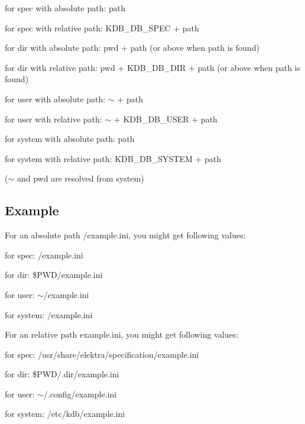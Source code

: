 \begin{DoxyItemize}
\item for spec with absolute path\+: path
\item for spec with relative path\+: {\ttfamily K\+D\+B\+\_\+\+D\+B\+\_\+\+S\+P\+EC} + path
\item for dir with absolute path\+: {\ttfamily pwd} + path (or above when path is found)
\item for dir with relative path\+: {\ttfamily pwd} + {\ttfamily K\+D\+B\+\_\+\+D\+B\+\_\+\+D\+IR} + path (or above when path is found)
\item for user with absolute path\+: {\ttfamily $\sim$} + path
\item for user with relative path\+: {\ttfamily $\sim$} + {\ttfamily K\+D\+B\+\_\+\+D\+B\+\_\+\+U\+S\+ER} + path
\item for system with absolute path\+: path
\item for system with relative path\+: {\ttfamily K\+D\+B\+\_\+\+D\+B\+\_\+\+S\+Y\+S\+T\+EM} + path
\end{DoxyItemize}

($\sim$ and {\ttfamily pwd} are resolved from system)

\subsection*{Example}

For an absolute path {\ttfamily /example.ini}, you might get following values\+:


\begin{DoxyItemize}
\item for spec\+: {\ttfamily /example.ini}
\item for dir\+: {\ttfamily \$\+P\+WD/example.ini}
\item for user\+: {\ttfamily $\sim$/example.ini}
\item for system\+: {\ttfamily /example.ini}
\end{DoxyItemize}

For an relative path example.\+ini, you might get following values\+:


\begin{DoxyItemize}
\item for spec\+: {\ttfamily /usr/share/elektra/specification/example.ini}
\item for dir\+: {\ttfamily \$\+P\+WD/.dir/example.\+ini}
\item for user\+: {\ttfamily $\sim$/.config/example.\+ini}
\item for system\+: {\ttfamily /etc/kdb/example.ini}
\end{DoxyItemize}

